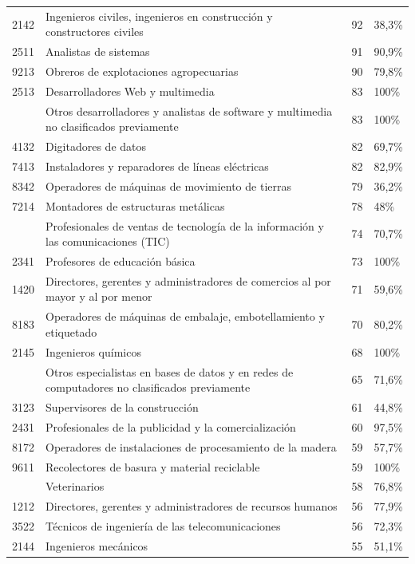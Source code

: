 \documentclass[
  11pt,
]{article}
\begin{document}
\begin{longtable}{r>{\raggedright\arraybackslash}p{9cm}rl}
2142 & Ingenieros civiles, ingenieros en construcción y constructores civiles & 92 & 38,3\%\\
2511 & Analistas de sistemas & 91 & 90,9\%\\
9213 & Obreros de explotaciones agropecuarias & 90 & 79,8\%\\
2513 & Desarrolladores Web y multimedia & 83 & 100\%\\
\addlinespace
2519 & Otros desarrolladores y analistas de software y multimedia no clasificados previamente & 83 & 100\%\\
4132 & Digitadores de datos & 82 & 69,7\%\\
7413 & Instaladores y reparadores de líneas eléctricas & 82 & 82,9\%\\
8342 & Operadores de máquinas de movimiento de tierras & 79 & 36,2\%\\
7214 & Montadores de estructuras metálicas & 78 & 48\%\\
\addlinespace
2434 & Profesionales de ventas de tecnología de la información y las comunicaciones (TIC) & 74 & 70,7\%\\
2341 & Profesores de educación básica & 73 & 100\%\\
1420 & Directores, gerentes y administradores de comercios al por mayor y al por menor & 71 & 59,6\%\\
8183 & Operadores de máquinas de embalaje, embotellamiento y etiquetado & 70 & 80,2\%\\
2145 & Ingenieros químicos & 68 & 100\%\\
\addlinespace
2529 & Otros especialistas en bases de datos y en redes de computadores no clasificados previamente & 65 & 71,6\%\\
3123 & Supervisores de la construcción & 61 & 44,8\%\\
2431 & Profesionales de la publicidad y la comercialización & 60 & 97,5\%\\
8172 & Operadores de instalaciones de procesamiento de la madera & 59 & 57,7\%\\
9611 & Recolectores de basura y material reciclable & 59 & 100\%\\
\addlinespace
2230 & Veterinarios & 58 & 76,8\%\\
1212 & Directores, gerentes y administradores de recursos humanos & 56 & 77,9\%\\
3522 & Técnicos de ingeniería de las telecomunicaciones & 56 & 72,3\%\\
2144 & Ingenieros mecánicos & 55 & 51,1\%\\

\end{longtable}
\end{document}
